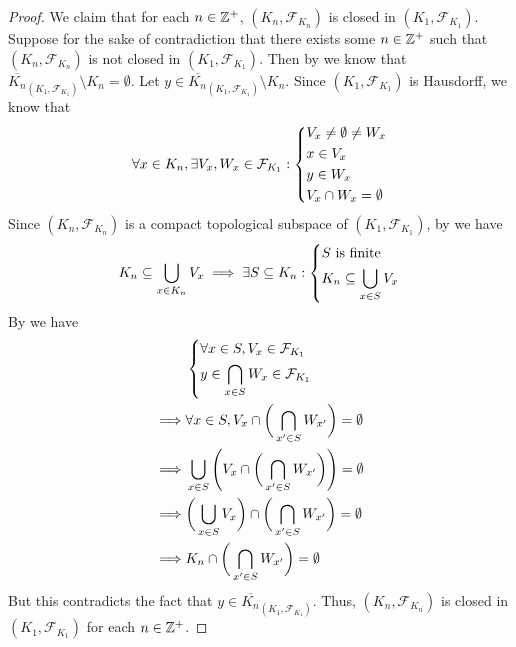 \begin{proof}
  We claim that for each \(n \in \mathbb{Z}^+\), \((K_n, \mathcal{F}_{K_n})\) is closed in \((K_1, \mathcal{F}_{K_1})\).
  Suppose for the sake of contradiction that there exists some \(n \in \mathbb{Z}^+\) such that \((K_n, \mathcal{F}_{K_n})\) is not closed in \((K_1, \mathcal{F}_{K_1})\).
  Then by  we know that \(\overline{K_n}_{(K_1, \mathcal{F}_{K_1})} \setminus K_n = \emptyset\).
  Let \(y \in \overline{K_n}_{(K_1, \mathcal{F}_{K_1})} \setminus K_n\).
  Since \((K_1, \mathcal{F}_{K_1})\) is Hausdorff, we know that
  \[
    \forall x \in K_n, \exists V_x, W_x \in \mathcal{F}_{K_1} : \begin{dcases}
      V_x \neq \emptyset \neq W_x \\
      x \in V_x                   \\
      y \in W_x                   \\
      V_x \cap W_x = \emptyset
    \end{dcases}
  \]
  Since \((K_n, \mathcal{F}_{K_n})\) is a compact topological subspace of \((K_1, \mathcal{F}_{K_1})\), by  we have
  \[
    K_n \subseteq \bigcup_{x \in K_n} V_x \implies \exists S \subseteq K_n : \begin{dcases}
      S \text{ is finite} \\
      K_n \subseteq \bigcup_{x \in S} V_x
    \end{dcases}
  \]
  By  we have
  \begin{align*}
             & \begin{dcases}
                 \forall x \in S, V_x \in \mathcal{F}_{K_1} \\
                 y \in \bigcap_{x \in S} W_x \in \mathcal{F}_{K_1}
               \end{dcases}                                         \\
    \implies & \forall x \in S, V_x \cap \bigg(\bigcap_{x' \in S} W_{x'}\bigg) = \emptyset              \\
    \implies & \bigcup_{x \in S} \Bigg(V_x \cap \bigg(\bigcap_{x' \in S} W_{x'}\bigg)\Bigg) = \emptyset \\
    \implies & \bigg(\bigcup_{x \in S} V_x\bigg) \cap \bigg(\bigcap_{x' \in S} W_{x'}\bigg) = \emptyset \\
    \implies & K_n \cap \bigg(\bigcap_{x' \in S} W_{x'}\bigg) = \emptyset
  \end{align*}
  But this contradicts the fact that \(y \in \overline{K_n}_{(K_1, \mathcal{F}_{K_1})}\).
  Thus, \((K_n, \mathcal{F}_{K_n})\) is closed in \((K_1, \mathcal{F}_{K_1})\) for each \(n \in \mathbb{Z}^+\).


\end{proof}

